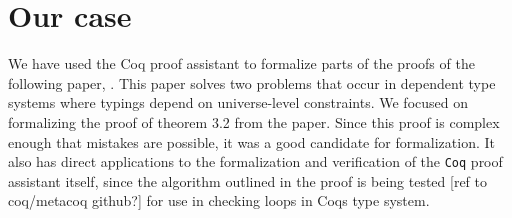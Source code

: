 \chapter{Our case}

We have used the Coq proof assistant to formalize parts of the proofs of the following paper, \citeauthor{mbezem} \cite{mbezem}.
This paper solves two problems that occur in dependent type systems where typings depend
on universe-level constraints. We focused on formalizing the proof of theorem 3.2 from the paper.
Since this proof is complex enough that mistakes are possible, it was a good candidate for formalization.
It also has direct applications to the formalization and verification of the \lstinline{Coq} proof assistant itself,
since the algorithm outlined in the proof is being tested [ref to coq/metacoq github?] for use in checking loops in Coqs type system.
